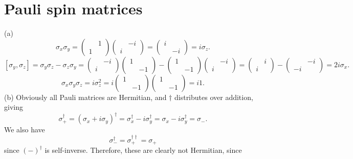 \documentclass[11pt, letterpaper]{article}
\begin{document}
\section{Pauli spin matrices}
(a)
\[
	\sigma _x\sigma _y=\begin{pmatrix}
	 & 1 \\
	1 & 
	\end{pmatrix}\begin{pmatrix}
	 & -i \\
	i & 
	\end{pmatrix}=\begin{pmatrix}
	i &  \\
	 & -i
	\end{pmatrix}=i\sigma _z
.\]
\[
	\left[ \sigma _y,\sigma _z \right] =\sigma _y\sigma _z-\sigma _z\sigma _y=\begin{pmatrix}
	 & -i \\
	i & 
	\end{pmatrix}\begin{pmatrix}
	1 &  \\
	 & -1
	\end{pmatrix}-\begin{pmatrix}
	1 &  \\
	 & -1
	\end{pmatrix}\begin{pmatrix}
	 & -i \\
	i & 
	\end{pmatrix}=\begin{pmatrix}
	 & i \\
	i & 
	\end{pmatrix}-\begin{pmatrix}
	 & -i \\
	-i & 
	\end{pmatrix}=2i\sigma _x
.\]
\[
	\sigma _x\sigma _y\sigma _z=i\sigma _z^2=i\begin{pmatrix}
	1 &  \\
	 & -1
	\end{pmatrix}\begin{pmatrix}
	1 &  \\
	 & -1
	\end{pmatrix}=i1
.\]
(b) Obviously all Pauli matrices are Hermitian, and $\dagger$ distributes over addition, giving
\[
	\sigma _+^\dagger = \left( \sigma _x + i\sigma _y \right) ^\dagger = \sigma _x^\dagger -i\sigma_y^\dagger = \sigma _x - i\sigma _y^\dagger = \sigma _-
.\]
We also have
\[
	\sigma _-^\dagger = \sigma _+^{\dagger\dagger}=\sigma _+
\]
since $(-)^\dagger$ is self-inverse. Therefore, these are clearly not Hermitian, since
\end{document}
